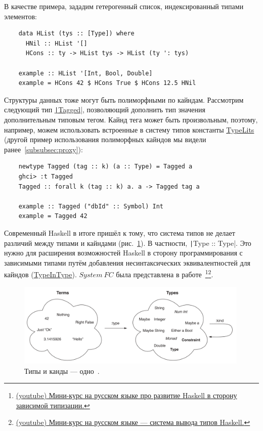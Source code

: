 В качестве примера, зададим гетерогенный список, индексированный типами элементов:
\begin{verbatim}
    data HList (tys :: [Type]) where
      HNil :: HList '[]
      HCons :: ty -> HList tys -> HList (ty ': tys)

    example :: HList '[Int, Bool, Double]
    example = HCons 42 $ HCons True $ HCons 12.5 HNil
\end{verbatim}

Структуры данных тоже могут быть полиморфными по кайндам.
Рассмотрим следующий тип \href{https://hackage.haskell.org/package/tagged-0.8.8/docs/Data-Tagged.html#t:Tagged}{\texttt|Tagged|}, позволяющий дополнить тип значения дополнительным типовым тегом.
Кайнд тега может быть произвольным, поэтому, например, можем использовать встроенные в систему типов константы \href{https://ghc.gitlab.haskell.org/ghc/doc/users_guide/exts/type_literals.html}{TypeLits} (другой пример использования полиморфных кайндов мы видели ранее\ \ref{subsubsec:proxy}):
\begin{verbatim}
    newtype Tagged (tag :: k) (a :: Type) = Tagged a
    ghci> :t Tagged
    Tagged :: forall k (tag :: k) a. a -> Tagged tag a

    example :: Tagged ("dbId" :: Symbol) Int
    example = Tagged 42
\end{verbatim}

Современный Haskell в итоге пришёл к тому, что система типов не делает различий между типами и кайндами (рис.~\ref{fig:types-eq-kinds}).
В частности, \texttt|Type :: Type|.
Это нужно для расширения возможностей Haskell в сторону программирования с зависимыми типами путём добавления несинтаксических эквивалентностей для кайндов (\href{https://ghc.gitlab.haskell.org/ghc/doc/users_guide/exts/poly_kinds.html#extension-TypeInType}{TypeInType}).
$System~FC$ была представлена в работе~\cite{weirich2013system}\footnote{\href{https://www.youtube.com/watch?v=ISGENChlA4M&list=PLvPsfYrGz3wufQguebnCduYgQQ9UMeJRt}{(youtube) Мини-курс на русском языке про развитие Haskell в сторону зависимой типизации.}}\footnote{\href{https://www.youtube.com/watch?v=_HYI7zjkrEs&list=PLvPsfYrGz3wuVAGhNf6-i7uafXg56oqM5&index=1}{(youtube) Мини-курс на русском языке --- система вывода типов Haskell.}}. %

\begin{figure}[h]
    \centering
    \includegraphics[width=0.99\textwidth]{figs/types-eq-kinds}
    \caption{Типы и канды --- одно~\cite{bragilevsky-haskell}.}
    \label{fig:types-eq-kinds}
\end{figure}

